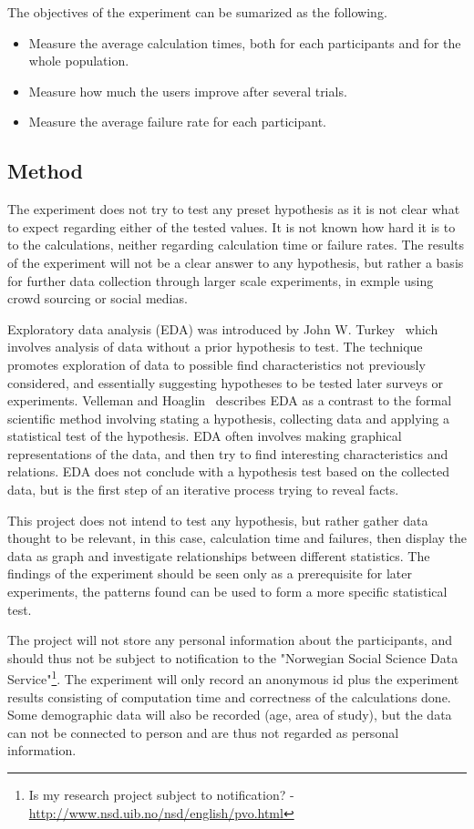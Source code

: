 \par The objectives of the experiment can be sumarized as the following.
\begin{itemize}
    \item Measure the average calculation times, both for each participants and for the whole population.
    \item Measure how much the users improve after several trials.
    \item Measure the average failure rate for each participant.
\end{itemize}

\subsection{Method}
The experiment does not try to test any preset hypothesis as it is not clear what to expect regarding either of the tested values. It is not known how hard it is to to the calculations, neither regarding calculation time or failure rates. The results of the experiment will not be a clear answer to any hypothesis, but rather a basis for further data collection through larger scale experiments, in exmple using crowd sourcing or social medias.

\par Exploratory data analysis (EDA) was introduced by John W. Turkey~\cite{turkey} which involves analysis of data without a prior hypothesis to test. The technique promotes exploration of data to possible find characteristics not previously considered, and essentially suggesting hypotheses to be tested later surveys or experiments. Velleman and Hoaglin~\cite{exploratory-analysis} describes EDA as a contrast to the formal scientific method involving stating a hypothesis, collecting data and applying a statistical test of the hypothesis. EDA often involves making graphical representations of the data, and then try to find interesting characteristics and relations. EDA does not conclude with a hypothesis test based on the collected data, but is the first step of an iterative process trying to reveal facts. 
\par This project does not intend to test any hypothesis, but rather gather data thought to be relevant, in this case, calculation time and failures, then display the data as graph and investigate relationships between different statistics. The findings of the experiment should be seen only as a prerequisite for later experiments, the patterns found can be used to form a more specific statistical test.
\par The project will not store any personal information about the participants, and should thus not be subject to notification to the "Norwegian Social Science Data Service"\footnote{Is my research project subject to notification? - \url{http://www.nsd.uib.no/nsd/english/pvo.html}}. The experiment will only record an anonymous id plus the experiment results consisting of computation time and correctness of the calculations done. Some demographic data will also be recorded (age, area of study), but the data can not be connected to person and are thus not regarded as personal information.



